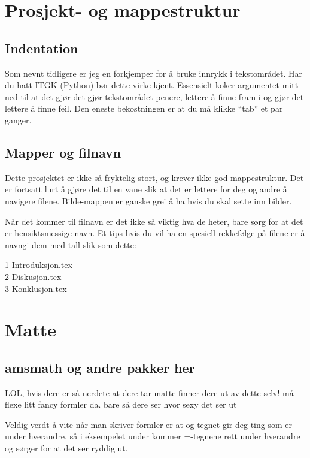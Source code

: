         

\section{Prosjekt- og mappestruktur}
    \subsection{Indentation}
        Som nevnt tidligere er jeg en forkjemper for å bruke innrykk i tekstområdet. Har du hatt ITGK (Python) bør dette virke kjent. Essensielt koker argumentet mitt ned til at det gjør det gjør tekstområdet penere, lettere å finne fram i og gjør det lettere å finne feil. Den eneste bekostningen er at du må klikke ``tab'' et par ganger.
        
    \subsection{Mapper og filnavn}
        Dette prosjektet er ikke så fryktelig stort, og krever ikke god mappestruktur. Det er fortsatt lurt å gjøre det til en vane slik at det er lettere for deg og andre å navigere filene. Bilde-mappen er ganske grei å ha hvis du skal sette inn bilder.
        
        Når det kommer til filnavn er det ikke så viktig hva de heter, bare sørg for at det er hensiktsmessige navn. Et tips hvis du vil ha en spesiell rekkefølge på filene er å navngi dem med tall slik som dette:
        
        1-Introduksjon.tex\\
        2-Diskusjon.tex\\
        3-Konklusjon.tex\\
                
    
\section{Matte}
    \subsection{amsmath og andre pakker her}

    LOL, hvis dere er så nerdete at dere tar matte finner dere ut av dette selv!
må flexe litt fancy formler da. bare så dere ser hvor sexy det ser ut


        Veldig verdt å vite når man skriver formler er at og-tegnet gir deg ting som er under hverandre, så i eksempelet under kommer =-tegnene rett under hverandre og sørger for at det ser ryddig ut. 

